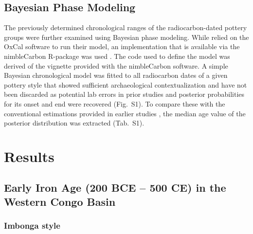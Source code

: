 \documentclass[smallextended,natbib]{svjour3}       %
\begin{document}
\subsection*{Bayesian Phase Modeling}

The previously determined chronological ranges of the radiocarbon-dated pottery groups \citep{Seidensticker.2021e, Seidensticker.2021} were further examined using Bayesian phase modeling. While \citet{Crema.2020a} relied on the OxCal software to run their model, an implementation that is available via the nimbleCarbon R-package was used \citep{Crema.2021a,Crema.2021b}. The code used to define the model was derived of the vignette provided with the nimbleCarbon software. A simple Bayesian chronological model was fitted to all radiocarbon dates of a given pottery style that showed sufficient archaeological contextualization and have not been discarded as potential lab errors in prior studies \citep[9]{Seidensticker.2021} and posterior probabilities for its onset and end were recovered (Fig.~S1). To compare these with the conventional estimations provided in earlier studies \citep[\url{https://github.com/dirkseidensticker/aSCAC};][Data S2]{Seidensticker.2021}, the median age value of the posterior distribution was extracted (Tab.~S1).

\section*{Results}

\subsection*{Early Iron Age (200 BCE – 500 CE) in the Western Congo Basin}

\subsubsection*{Imbonga style}
\end{document}
